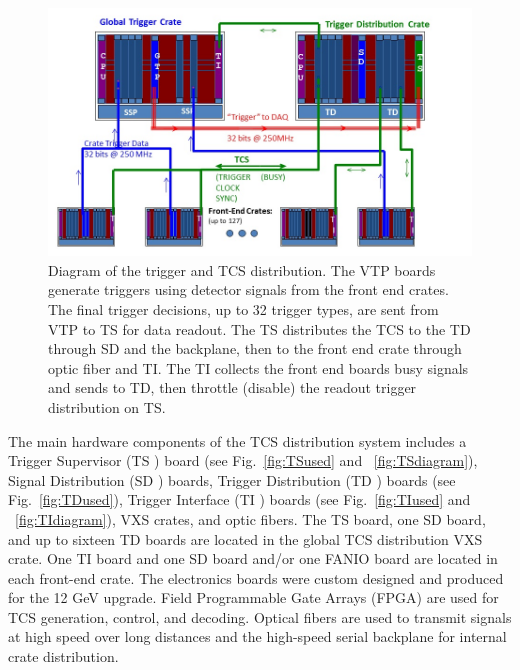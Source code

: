 \begin{figure}[hbt]
	\centering
	\includegraphics[width=1.0\columnwidth,keepaspectratio]{img/TCSdiagram.jpg}
	\caption{Diagram of the trigger and TCS distribution. The VTP boards generate triggers using detector signals from the front end crates.  The final trigger decisions, up to 32 trigger types, are sent from VTP to TS for data readout.  The TS distributes the TCS to the TD through SD and the backplane, then to the front end crate through optic fiber and TI.  The TI collects the front end boards busy signals and sends to TD, then throttle (disable) the readout trigger distribution on TS.}
	\label{fig:TCSdiagram}
\end{figure}


The main hardware components of the TCS distribution system includes a Trigger Supervisor (TS \cite{ts-ref}) board (see Fig.~\ref{fig:TSused} and ~\ref{fig:TSdiagram}), Signal Distribution (SD \cite{sd-ref}) boards, Trigger Distribution (TD \cite{titd-ref}) boards  (see Fig.~\ref{fig:TDused}), Trigger Interface (TI \cite{titd-ref}) boards  (see Fig.~\ref{fig:TIused} and ~\ref{fig:TIdiagram}), VXS crates, and optic fibers.  The TS board, one SD board, and up to sixteen TD boards are located in the global TCS distribution VXS crate.  One TI board and one SD board and/or one FANIO board are located in each front-end crate.  The electronics boards were custom designed and produced for the 12 GeV upgrade.  Field Programmable Gate Arrays (FPGA) are used for TCS generation, control, and decoding.  Optical fibers are used to transmit signals at high speed over long distances and the high-speed serial backplane for internal crate distribution.  

